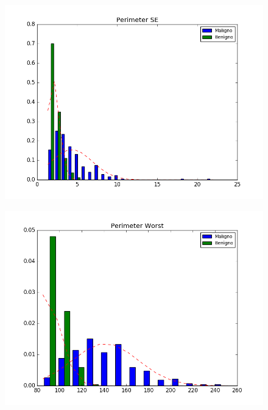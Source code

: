 \documentclass[11pt,a4paper]{article}
\numberwithin{equation}{section}
\begin{document}
\begin{itemize}
\begin{figure}[H]
\centering
\begin{minipage}{.5\textwidth}
  \centering
  \includegraphics[width=\linewidth]{../img/hist/perimeter_se}
  \label{fig:test1}
\end{minipage}%
\begin{minipage}{.5\textwidth}
  \centering
  \includegraphics[width=\linewidth]{../img/hist/perimeter_worst}
  \label{fig:test2}
\end{minipage}
\end{figure}



\end{itemize}
\end{document}
